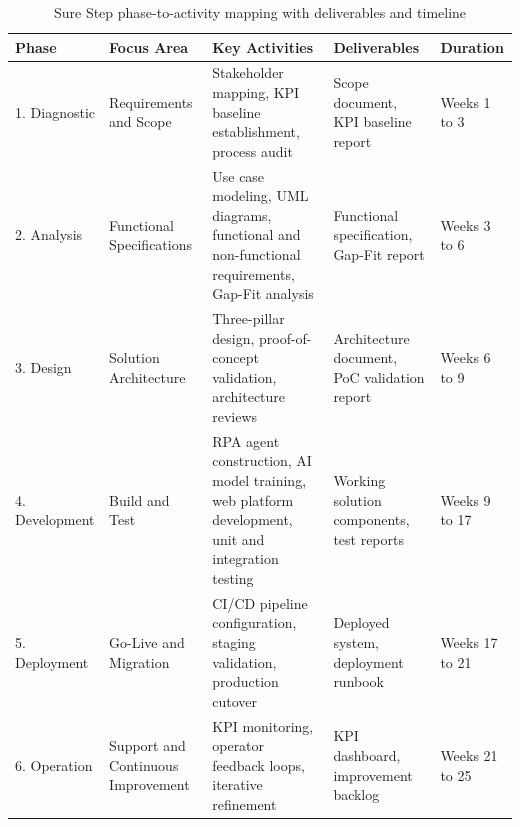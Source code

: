 \begin{table}[H]
  \centering
  \caption{Sure Step phase-to-activity mapping with deliverables and timeline}
  \renewcommand{\arraystretch}{1.0}
  \footnotesize
  \begin{tabularx}{\textwidth}{|X|X|X|X|X|}
    \hline
    \textbf{Phase} & \textbf{Focus Area} & \textbf{Key Activities} & \textbf{Deliverables} & \textbf{Duration} \\ \hline
    1. Diagnostic & Requirements and Scope & Stakeholder mapping, KPI baseline establishment, process audit & Scope document, KPI baseline report & Weeks 1 to 3 \\ \hline
    2. Analysis & Functional Specifications & Use case modeling, UML diagrams, functional and non-functional requirements, Gap-Fit analysis & Functional specification, Gap-Fit report & Weeks 3 to 6 \\ \hline
    3. Design & Solution Architecture & Three-pillar design, proof-of-concept validation, architecture reviews & Architecture document, PoC validation report & Weeks 6 to 9 \\ \hline
    4. Development & Build and Test & RPA agent construction, AI model training, web platform development, unit and integration testing & Working solution components, test reports & Weeks 9 to 17 \\ \hline
    5. Deployment & Go-Live and Migration & CI/CD pipeline configuration, staging validation, production cutover & Deployed system, deployment runbook & Weeks 17 to 21 \\ \hline
    6. Operation & Support and Continuous Improvement & KPI monitoring, operator feedback loops, iterative refinement & KPI dashboard, improvement backlog & Weeks 21 to 25 \\ \hline
  \end{tabularx}
\end{table}

